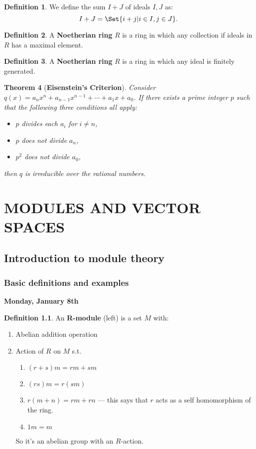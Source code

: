 \documentclass[9pt,reqno,twoside]{amsbook}
\theoremstyle{plain}
\newtheorem{theorem}{Theorem}[chapter]
\numberwithin{section}{chapter}
\numberwithin{equation}{chapter}
\theoremstyle{definition}
\newtheorem{Def}[theorem]{Definition}
\theoremstyle{remark}
\theoremstyle{plain}
\begin{document}
\begin{Def}
We define the sum $I+J$ of ideals $I,J$ as:
$$
I+J = \Set{i + j|i\in I,j \in J}.
$$
\end{Def}

\begin{Def}
A \textbf{Noetherian ring} $R$ is a ring in which any collection if ideals in $R$ has a maximal element. 
\end{Def}

\begin{Def}
A \textbf{Noetherian ring} $R$ is a ring in which any ideal is finitely generated. 
\end{Def}

\begin{theorem}[\textbf{Eisenstein's Criterion}]
Consider $q(x) = a_nx^n + a_{n - 1}x^{n - 1} + \cdots + a_1x + a_0$. If there exists a prime integer $p$ such that the following three conditions all apply:
\begin{itemize}
\item $p$ divides each $a_i$ for $i \neq n$,
\item $p$ does not divide $a_n$,
\item $p^2$ does not divide $a_0$,
\end{itemize}
then $q$ is irreducible over the rational numbers. 
\end{theorem}






\mainmatter
%
\setcounter{part}{2}
\part{MODULES AND VECTOR SPACES}
\setcounter{chapter}{9}



\chapter{Introduction to module theory}
\section{Basic definitions and examples}



\textbf{Monday, January 8th}
\begin{Def}
An \textbf{R-module} (left) is a set $M$ with: 
\begin{enumerate}
\item Abelian addition operation
\item Action of $R$ on $M$ s.t. 
\begin{enumerate}
\item $(r + s)m = rm + sm$ 
\item $(rs)m = r(sm)$
\item $r(m + n) = rm + rn$ --- this says that $r$ acts as a self homomorphism of the ring. 
\item $1m = m$
\end{enumerate}
So it's an abelian group with an $R$-action. 
\end{enumerate}
\end{Def}
\end{document}
